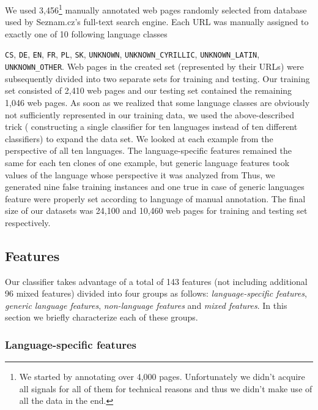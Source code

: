 \documentclass{acm_proc_article-sp}
\begin{document}
  We used 3,456\footnote{We started by annotating over 4,000 pages.
  Unfortunately we didn't acquire all signals for all of them for technical reasons and thus
  we didn't make use of all the data in the end.} manually annotated 
  web pages randomly selected from database
  used by Seznam.cz's full-text search engine. Each URL was manually assigned
  to exactly one of 10 following language classes {\texttt{CS}, \texttt{DE},
  \texttt{EN}, \texttt{FR}, \texttt{PL}, \texttt{SK}, \texttt{UNKNOWN}, 
  \texttt{UNKNOWN\_CYRILLIC}, \texttt{UNKNOWN\_LATIN},
  \texttt{UNKNOWN\_OTHER}. Web pages in the created set (represented by their
  URLs) were subsequently divided into two separate sets for training and
  testing. Our training set consisted of 2,410 web pages and our testing set
  contained the remaining 1,046 web pages. As soon as we realized that some
  language classes are obviously not sufficiently represented in our training
  data, we used the above-described trick ( constructing a single classifier for
  ten languages instead of ten different classifiers) to expand the data set. 
  We looked at each example from the perspective of all ten languages. The 
  language-specific features remained the same for each ten clones of one example,
  but generic language features took values of the language whose perspective
  it was analyzed from  Thus, we generated nine false training instances and 
  one true in case of generic languages feature were properly set according to 
  language of manual  annotation. The final size of our datasets was
  24,100 and 10,460 web pages for training and testing set respectively.


  \subsection{Features}
  Our classifier takes advantage of a total of 143 features (not including additional 96 mixed features) divided into four groups
  as follows: \textit{language-specific features}, \textit{generic language features}, \textit{non-language
  features} and \textit{mixed features}. In this section we briefly characterize each of these
  groups.

\subsubsection{Language-specific features}

}
\end{document}
